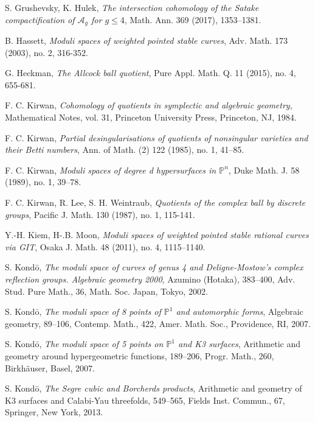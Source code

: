\documentclass[12pt, pdftex]{amsart}
\theoremstyle{plain}
\theoremstyle{definition}
\numberwithin{equation}{section}
\def\A{{\mathbb A}}
\def\P{{\mathbb P}}
\def\A{\mathcal{A}}
\begin{document}
\begin{thebibliography}{99}
S. Grushevsky, K. Hulek,
\textit{The intersection cohomology of the Satake compactification of ${\A}_g$ for $g \leq 4$},
Math. Ann. 369 (2017), 1353--1381.

B. Hassett,
\textit{Moduli spaces of weighted pointed stable curves},
Adv. Math. 173 (2003), no. 2, 316-352.

G. Heckman,
\textit{The Allcock ball quotient},
Pure Appl. Math. Q. 11 (2015), no. 4, 655-681.

F. C. Kirwan,
\textit{Cohomology of quotients in symplectic and algebraic geometry},
Mathematical Notes, vol. 31, Princeton University Press, Princeton, NJ, 1984.

F. C. Kirwan,
\textit{Partial desingularisations of quotients of nonsingular varieties and their
Betti numbers},
Ann. of Math. (2) 122 (1985), no. 1, 41–85.

F. C. Kirwan,
\textit{Moduli spaces of degree d hypersurfaces in $\P^n$},
Duke Math. J. 58 (1989),
no. 1, 39–78.


F. C. Kirwan, R. Lee, S. H. Weintraub,
\textit{Quotients of the complex ball by discrete groups},
Pacific J. Math. 130 (1987), no. 1, 115-141.

Y.-H. Kiem, H-.B. Moon,
\textit{Moduli spaces of weighted pointed stable rational curves via GIT},
Osaka J. Math. 48 (2011), no. 4, 1115–1140.



S. Kond\={o},
\textit{The moduli space of curves of genus 4 and Deligne-Mostow's complex reflection groups. Algebraic geometry 2000},
Azumino (Hotaka), 383–400,
Adv. Stud. Pure Math., 36, Math. Soc. Japan, Tokyo, 2002.

S. Kond\={o},
\textit{The moduli space of 8 points of $\mathbb{P}^1$ and automorphic forms},
Algebraic geometry, 89–106,
Contemp. Math., 422, Amer. Math. Soc., Providence, RI, 2007.

S. Kond\={o},
\textit{The moduli space of 5 points on $\P^1$ and K3 surfaces},
Arithmetic and geometry around hypergeometric functions, 189–206,
Progr. Math., 260, Birkhäuser, Basel, 2007.

S. Kond\={o},
\textit{The Segre cubic and Borcherds products},
Arithmetic and geometry of K3 surfaces and Calabi-Yau threefolds, 549–565,
Fields Inst. Commun., 67, Springer, New York, 2013.


\end{thebibliography}
\end{document}
